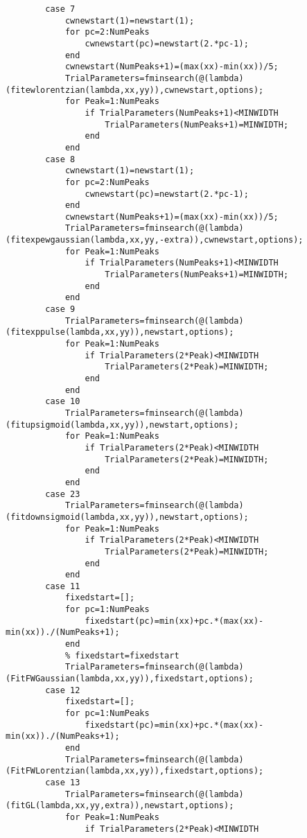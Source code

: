 \begin{lstlisting}
        case 7
            cwnewstart(1)=newstart(1);
            for pc=2:NumPeaks
                cwnewstart(pc)=newstart(2.*pc-1);
            end
            cwnewstart(NumPeaks+1)=(max(xx)-min(xx))/5;
            TrialParameters=fminsearch(@(lambda)(fitewlorentzian(lambda,xx,yy)),cwnewstart,options);
            for Peak=1:NumPeaks
                if TrialParameters(NumPeaks+1)<MINWIDTH
                    TrialParameters(NumPeaks+1)=MINWIDTH;
                end
            end
        case 8
            cwnewstart(1)=newstart(1);
            for pc=2:NumPeaks
                cwnewstart(pc)=newstart(2.*pc-1);
            end
            cwnewstart(NumPeaks+1)=(max(xx)-min(xx))/5;
            TrialParameters=fminsearch(@(lambda)(fitexpewgaussian(lambda,xx,yy,-extra)),cwnewstart,options);
            for Peak=1:NumPeaks
                if TrialParameters(NumPeaks+1)<MINWIDTH
                    TrialParameters(NumPeaks+1)=MINWIDTH;
                end
            end
        case 9
            TrialParameters=fminsearch(@(lambda)(fitexppulse(lambda,xx,yy)),newstart,options);
            for Peak=1:NumPeaks
                if TrialParameters(2*Peak)<MINWIDTH
                    TrialParameters(2*Peak)=MINWIDTH;
                end
            end
        case 10
            TrialParameters=fminsearch(@(lambda)(fitupsigmoid(lambda,xx,yy)),newstart,options);
            for Peak=1:NumPeaks
                if TrialParameters(2*Peak)<MINWIDTH
                    TrialParameters(2*Peak)=MINWIDTH;
                end
            end
        case 23
            TrialParameters=fminsearch(@(lambda)(fitdownsigmoid(lambda,xx,yy)),newstart,options);
            for Peak=1:NumPeaks
                if TrialParameters(2*Peak)<MINWIDTH
                    TrialParameters(2*Peak)=MINWIDTH;
                end
            end
        case 11
            fixedstart=[];
            for pc=1:NumPeaks
                fixedstart(pc)=min(xx)+pc.*(max(xx)-min(xx))./(NumPeaks+1);
            end
            % fixedstart=fixedstart
            TrialParameters=fminsearch(@(lambda)(FitFWGaussian(lambda,xx,yy)),fixedstart,options);
        case 12
            fixedstart=[];
            for pc=1:NumPeaks
                fixedstart(pc)=min(xx)+pc.*(max(xx)-min(xx))./(NumPeaks+1);
            end
            TrialParameters=fminsearch(@(lambda)(FitFWLorentzian(lambda,xx,yy)),fixedstart,options);
        case 13
            TrialParameters=fminsearch(@(lambda)(fitGL(lambda,xx,yy,extra)),newstart,options);
            for Peak=1:NumPeaks
                if TrialParameters(2*Peak)<MINWIDTH

\end{lstlisting}
